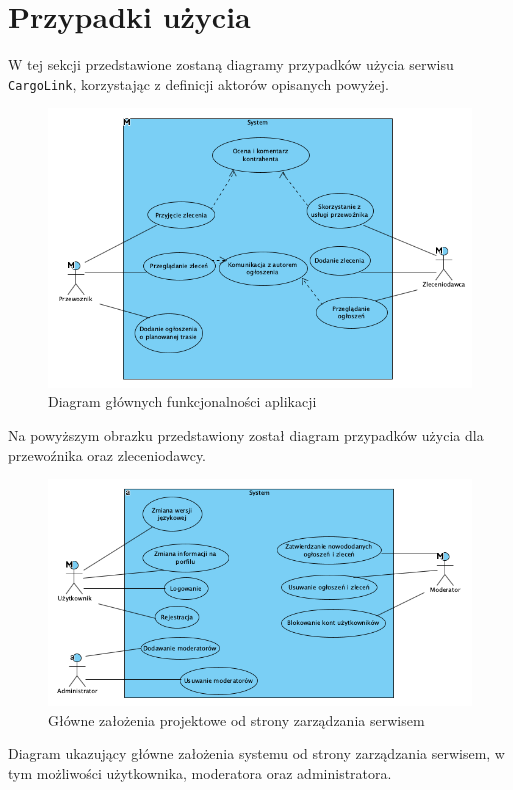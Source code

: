 \section{Przypadki użycia}
W tej sekcji przedstawione zostaną diagramy przypadków użycia serwisu \texttt{CargoLink}, korzystając z definicji aktorów opisanych powyżej.
\begin{figure}[H]
	\centering
		\includegraphics[width=0.9\linewidth]{rozdzial1/glowne_zalozenia.png}
	\caption{Diagram głównych funkcjonalności aplikacji}
	\label{Rys. fig:Diagram głównych funkcjonalności aplikacji}
\end{figure}

Na powyższym obrazku przedstawiony został diagram przypadków użycia dla przewoźnika oraz zleceniodawcy.

\begin{figure}[H]
	\centering
		\includegraphics[width=0.9\linewidth]{rozdzial1/ogolny_schemat.png}
	\caption{Główne założenia projektowe od strony zarządzania serwisem}
	\label{Rys. fig:Główne założenia projektowe od strony zarządzania serwisem}
\end{figure}

Diagram ukazujący główne założenia systemu od strony zarządzania serwisem, w tym możliwości użytkownika, moderatora oraz administratora.
